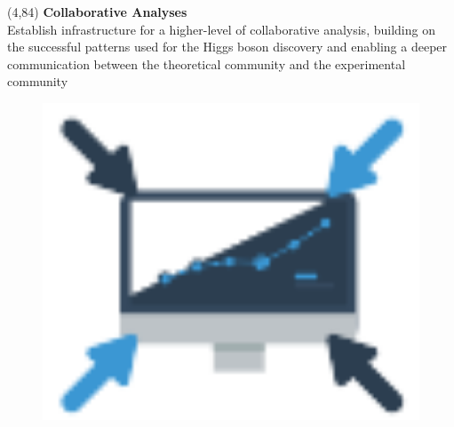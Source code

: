 \begin{textblock}{17.5}(4,84)
{\bf Collaborative Analyses} \\
Establish infrastructure for a higher-level of collaborative analysis, building on the successful patterns used for the Higgs boson discovery and enabling a deeper communication between the theoretical community and the experimental community 
\begin{figure}[tbph]
\centering
\includegraphics[width=1.0\textwidth]{collaborate.png}
\end{figure}
\end{textblock}

